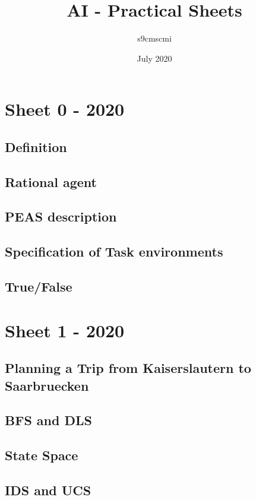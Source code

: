 \documentclass{article}
\title{AI - Practical Sheets}
\author{s9cmscmi }
\date{July 2020}
\begin{document}
\maketitle



\section{Sheet 0 - 2020}
    \subsection{Definition}
    \subsection{Rational agent}
    \subsection{PEAS description}
    \subsection{Specification of Task environments}
    \subsection{True/False}
    

\section{Sheet 1 - 2020}
    \subsection{Planning a Trip from Kaiserslautern to Saarbruecken}
    \subsection{BFS and DLS}
    \subsection{State Space}
    \subsection{IDS and UCS}
    
    
\end{document}
